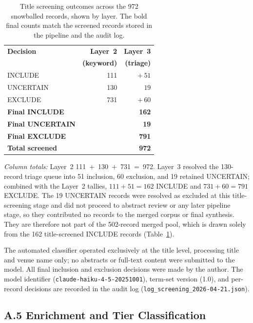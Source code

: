 \begin{table}[H]
\centering
\caption{Title screening outcomes across the 972 snowballed records, shown by
layer. The bold final counts match the screened records stored in the pipeline
and the audit log.}
\label{tab:screening}
\begin{tabular}{lrr}
\toprule
\textbf{Decision} & \textbf{Layer~2} & \textbf{Layer~3} \\
 & \textbf{(keyword)} & \textbf{(triage)} \\
\midrule
INCLUDE           & 111 & ${+}\,51$ \\
UNCERTAIN         & 130 & $\phantom{+}19$ \\
EXCLUDE           & 731 & ${+}\,60$ \\
\midrule
\textbf{Final INCLUDE}   & \multicolumn{2}{r}{\textbf{162}} \\
\textbf{Final UNCERTAIN} & \multicolumn{2}{r}{\textbf{19}} \\
\textbf{Final EXCLUDE}   & \multicolumn{2}{r}{\textbf{791}} \\
\midrule
\textbf{Total screened}  & \multicolumn{2}{r}{\textbf{972}} \\
\bottomrule
\end{tabular}
\end{table}
\vspace*{-2pt}
\emph{Column totals:} Layer~2 \mbox{111 + 130 + 731 = 972}. Layer~3 resolved
the 130-record triage queue into 51 inclusion, 60 exclusion, and 19 retained
UNCERTAIN; combined with the Layer~2 tallies, $111{+}51{=}162$ INCLUDE and
$731{+}60{=}791$ EXCLUDE. The 19 UNCERTAIN records were resolved as excluded
at this title-screening stage and did not proceed to abstract review or any
later pipeline stage, so they contributed no records to the merged corpus or
final synthesis. They are therefore not part of the 502-record merged pool,
which is drawn solely from the 162 title-screened INCLUDE records
(Table~\ref{tab:screening}).

The automated classifier operated exclusively at the title level, processing
title and venue name only; no abstracts or full-text content were submitted
to the model. All final inclusion and exclusion decisions were made by the
author. The model identifier (\texttt{claude-haiku-4-5-20251001}), term-set
version (1.0), and per-record decisions are recorded in the audit log
(\texttt{log\_screening\_2026-04-21.json}).

\subsection*{A.5 Enrichment and Tier Classification}

